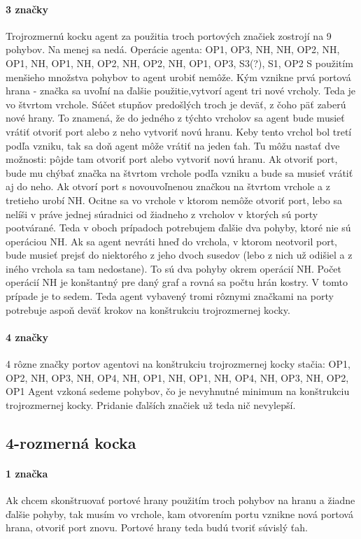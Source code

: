 \paragraph{3 značky}
Trojrozmernú kocku agent za použitia troch portových značiek zostrojí na 9
pohybov. Na menej sa nedá.
Operácie agenta: OP1, OP3, NH, NH, OP2, NH, OP1, NH, OP1, NH, OP2, NH, OP2,
NH, OP1, OP3, S3(?), S1, OP2
S použitím menšieho množstva pohybov to agent urobiť nemôže. Kým vznikne
prvá portová hrana - značka sa uvoľní na ďalšie použitie,vytvorí agent tri
nové vrcholy. Teda je vo štvrtom vrchole. Súčet  stupňov predošlých troch je
deväť, z čoho päť zaberú nové hrany. To znamená, že do jedného z týchto
vrcholov sa agent bude musieť vrátiť otvoriť port alebo z neho vytvoriť novú
hranu. Keby tento vrchol bol tretí podľa vzniku, tak sa doň agent môže
vrátiť na jeden ťah. Tu môžu nastať dve možnosti: pôjde tam otvoriť port
alebo vytvoriť novú hranu. Ak otvoriť port, bude mu chýbať značka na štvrtom
vrchole podľa vzniku a bude sa musieť vrátiť aj do neho. Ak otvorí port s
novouvoľnenou značkou na štvrtom vrchole a z tretieho urobí NH. Ocitne sa vo
vrchole v ktorom nemôže otvoriť port, lebo sa nelíši v práve jednej
súradnici od žiadneho z vrcholov v ktorých sú porty pootvárané. Teda v oboch
prípadoch potrebujem ďalšie dva pohyby, ktoré nie sú operáciou NH. Ak sa
agent nevráti hneď do vrchola, v ktorom neotvoril port, bude musieť prejsť
do niektorého z jeho dvoch susedov (lebo z nich už odišiel a z iného vrchola
sa tam nedostane). To sú dva pohyby okrem operácií NH. Počet operácií NH je
konštantný pre daný  graf a rovná sa počtu hrán kostry. V tomto prípade je
to sedem. Teda agent vybavený tromi rôznymi značkami na porty potrebuje
aspoň deväť krokov na konštrukciu trojrozmernej kocky.

\paragraph{4 značky}
4 rôzne značky portov agentovi na konštrukciu trojrozmernej kocky stačia:
OP1, OP2, NH, OP3, NH, OP4, NH, OP1, NH, OP1, NH, OP4, NH, OP3, NH, OP2, OP1
Agent vzkoná sedeme pohybov, čo je nevyhnutné minimum na konštrukciu
trojrozmernej kocky. Pridanie ďalších značiek už teda nič nevylepší.

\subsection{4-rozmerná kocka}
\paragraph{1 značka}
Ak chcem skonštruovať portové hrany použitím troch pohybov na hranu a žiadne
ďalšie pohyby, tak musím vo vrchole, kam otvorením portu vznikne nová
portová hrana, otvoriť port znovu. Portové hrany teda budú tvoriť súvislý
ťah. 



